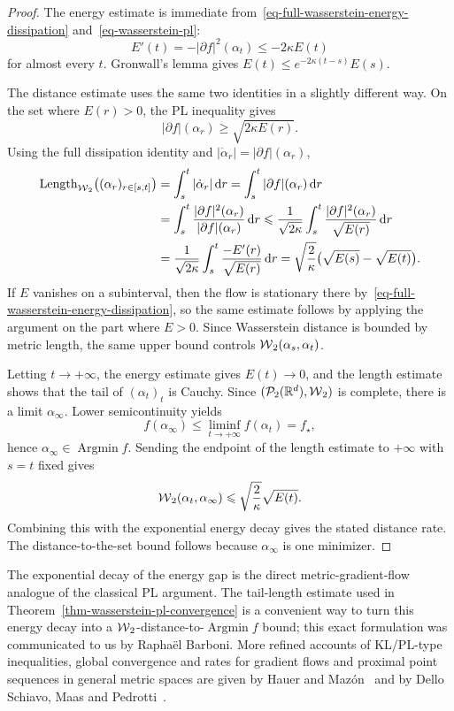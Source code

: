 \begin{proof}
	The energy estimate is immediate from~\eqref{eq-full-wasserstein-energy-dissipation} and~\eqref{eq-wasserstein-pl}:
	\[
		E'(t)
		=
		-|\partial f|^2(\alpha_t)
		\leq
		-2\kappa E(t)
	\]
	for almost every \(t\). Gronwall's lemma gives \(E(t)\leq e^{-2\kappa(t-s)}E(s)\).

	The distance estimate uses the same two identities in a slightly different way. On the set where \(E(r)>0\), the PL inequality gives
	\[
		|\partial f|(\alpha_r)\geq \sqrt{2\kappa E(r)}.
	\]
	Using the full dissipation identity and \(|\dot\alpha_r|=|\partial f|(\alpha_r)\),
	\[
		\begin{aligned}
		\operatorname{Length}_{\operatorname{\mathcal{W}}_2}\bigl((\alpha_r)_{r\in[s,t]}\bigr)
		&=
		\int_s^t|\dot\alpha_r|\,\mathrm{d} r
		=
		\int_s^t|\partial f|(\alpha_r)\,\mathrm{d} r \\
		&=
		\int_s^t
		\frac{|\partial f|^2(\alpha_r)}{|\partial f|(\alpha_r)}\,\mathrm{d} r
		\leqslant
		\frac{1}{\sqrt{2\kappa}}
		\int_s^t
		\frac{|\partial f|^2(\alpha_r)}{\sqrt{E(r)}}\,\mathrm{d} r \\
		&=
		\frac{1}{\sqrt{2\kappa}}
		\int_s^t
		\frac{-E'(r)}{\sqrt{E(r)}}\,\mathrm{d} r
		=
		\sqrt{\frac{2}{\kappa}}\bigl(\sqrt{E(s)}-\sqrt{E(t)}\bigr).
		\end{aligned}
	\]
	If \(E\) vanishes on a subinterval, then the flow is stationary there by~\eqref{eq-full-wasserstein-energy-dissipation}, so the same estimate follows by applying the argument on the part where \(E>0\). Since Wasserstein distance is bounded by metric length, the same upper bound controls \(\operatorname{\mathcal{W}}_2(\alpha_s,\alpha_t)\).

	Letting \(t\to+\infty\), the energy estimate gives \(E(t)\to0\), and the length estimate shows that the tail of \((\alpha_t)_t\) is Cauchy. Since \((\mathcal{P}_2(\mathbb{R}^d),\operatorname{\mathcal{W}}_2)\) is complete, there is a limit \(\alpha_\infty\). Lower semicontinuity yields
	\[
		f(\alpha_\infty)
		\leq
		\liminf_{t\to+\infty}f(\alpha_t)
		=
		f_\star,
	\]
	hence \(\alpha_\infty\in\operatorname{Argmin}f\). Sending the endpoint of the length estimate to \(+\infty\) with \(s=t\) fixed gives
	\[
		\operatorname{\mathcal{W}}_2(\alpha_t,\alpha_\infty)
		\leqslant
		\sqrt{\frac{2}{\kappa}}\sqrt{E(t)}.
	\]
	Combining this with the exponential energy decay gives the stated distance rate. The distance-to-the-set bound follows because \(\alpha_\infty\) is one minimizer.
\end{proof}

The exponential decay of the energy gap is the direct metric-gradient-flow analogue of the classical PL argument. The tail-length estimate used in Theorem~\ref{thm-wasserstein-pl-convergence} is a convenient way to turn this energy decay into a \(\operatorname{\mathcal{W}}_2\)-distance-to-\(\operatorname{Argmin}f\) bound; this exact formulation was communicated to us by Rapha{\"e}l Barboni. More refined accounts of KL/PL-type inequalities, global convergence and rates for gradient flows and proximal point sequences in general metric spaces are given by Hauer and Maz{\'o}n~\cite{HauerMazon2019KLSMetric} and by Dello Schiavo, Maas and Pedrotti~\cite{DelloSchiavoMaasPedrotti2023LocalConditions}.

